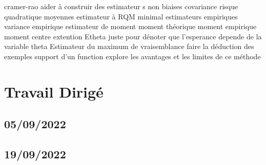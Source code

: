 \documentclass{article}
\begin{document}
cramer-rao
aider à construir des estimateur s non biaises
covariance
risque quadratique moyennes
estimateur à RQM minimal
estimateurs empiriques
variance empirique
estimateur de moment
moment théorique
moment empirique
moment centre
extention
Etheta juste pour dénoter que l'esperance depende de la variable theta
Estimateur du maximum de vraisemblance
faire la déduction des exemples
support d'un function
explore les avantages et les limites de ce méthode


\section{Travail Dirigé}
\subsection{05/09/2022}
\subsection{19/09/2022}
\end{document}
